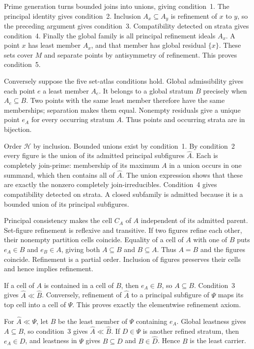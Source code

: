 Prime generation turns bounded joins into unions, giving
condition~1. The principal identity gives condition~2.
Inclusion $A_x\subseteq A_y$ is refinement of $x$ to $y$,
so the preceding argument gives condition~3. Compatibility
detected on strata gives condition~4. Finally the global
family is all principal refinement ideals $A_x$. A point $x$
has least member $A_x$, and that member has global residual
$\{x\}$. These sets cover $M$ and separate points by
antisymmetry of refinement. This proves condition~5.

Conversely suppose the five set-atlas conditions hold.
Global admissibility gives each point $e$ a least member $A_e$.
It belongs to a global stratum $B$ precisely when $A_e\subseteq B$.
Two points with the same least member therefore have the same
memberships; separation makes them equal. Nonempty residuals
give a unique point $e_A$ for every occurring stratum $A$.
Thus points and occurring strata are in bijection.

Order $\mathscr H$ by inclusion. Bounded unions exist by
condition~1. By condition~2 every figure is the union of its
admitted principal subfigures $\widehat A$. Each is completely
join-prime: membership of its maximum $A$ in a union occurs
in one summand, which then contains all of $\widehat A$.
The union expression shows that these are exactly the nonzero
completely join-irreducibles. Condition~4 gives compatibility
detected on strata. A closed subfamily is admitted because it
is a bounded union of its principal subfigures.

Principal consistency makes the cell $C_A$ of $A$ independent
of its admitted parent. Set-figure refinement is reflexive and
transitive. If two figures refine each other, their nonempty
partition cells coincide. Equality of a cell of $A$ with one
of $B$ puts $e_A\in B$ and $e_B\in A$, giving both
$A\subseteq B$ and $B\subseteq A$. Thus $A=B$ and
the figures coincide. Refinement is a partial order. Inclusion
of figures preserves their cells and hence implies refinement.

If a cell of $A$ is contained in a cell of $B$, then
$e_A\in B$, so $A\subseteq B$. Condition~3 gives
$\widehat A\ll\widehat B$. Conversely, refinement of
$\widehat A$ to a principal subfigure of $\Psi$ maps its
top cell into a cell of $\Psi$. This proves exactly the
elementwise refinement axiom.

For $\widehat A\ll\Psi$, let $B$ be the least member of
$\Psi$ containing $e_A$. Global leastness gives $A\subseteq B$,
so condition~3 gives $\widehat A\ll\widehat B$.
If $D\in\Psi$ is another refined stratum, then $e_A\in D$,
and leastness in $\Psi$ gives $B\subseteq D$ and
$B\in\widehat D$. Hence $B$ is the least carrier.

